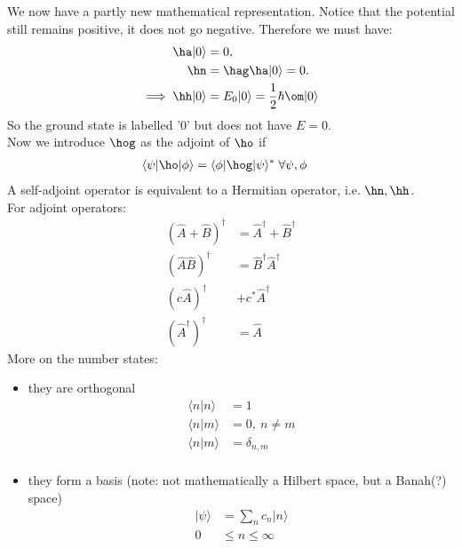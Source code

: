 \documentclass[a4paper, 11pt, normalem]{report}
\begin{document}
We now have a partly new mathematical representation. 
Notice that the potential still remains positive, it does not go negative.
Therefore we must have:
\begin{align}
    \ha|0\rangle &= 0, \\
    \hn &= \hag\ha|0\rangle = 0. \\
    \implies \hh|0\rangle &= E_0|0\rangle = \frac12\hbar\om|0\rangle
\end{align}
So the ground state is labelled '0' but does not have $E=0$.\\
Now we introduce $\hog$ as the adjoint of $\ho$ if
\begin{align}
    \langle\psi|\ho|\phi\rangle &= \langle\phi|\hog|\psi\rangle^*\; \forall \psi,\phi
\end{align}
A self-adjoint operator is equivalent to a Hermitian operator, i.e. $\hn, \hh$.\\
For adjoint operators:
\begin{align}
    (\hat{A}+\hat{B})^\dagger &= \hat{A}^\dagger + \hat{B}^\dagger \\
    (\hat{A}\hat{B})^\dagger &= \hat{B}^\dagger\hat{A}^\dagger \\
    (c\hat{A})^\dagger &+ c^*\hat{A}^\dagger \\
    (\hat{A}^\dagger)^\dagger &= \hat{A}
\end{align}
More on the number states:
\begin{itemize}
    \item they are orthogonal
        \begin{align}
            \langle n|n\rangle &= 1 \\
            \langle n|m\rangle &= 0,~ n\neq m \\
            \langle n|m\rangle &= \delta_{n,m} \\
        \end{align}
    \item they form a basis (note: not mathematically a Hilbert space, but a Banah(?) space)
        \begin{align}
            |\psi\rangle &= \sum_n c_n|n\rangle \\
            0 &\leq n \leq \infty
        \end{align}
\end{itemize}
\end{document}
